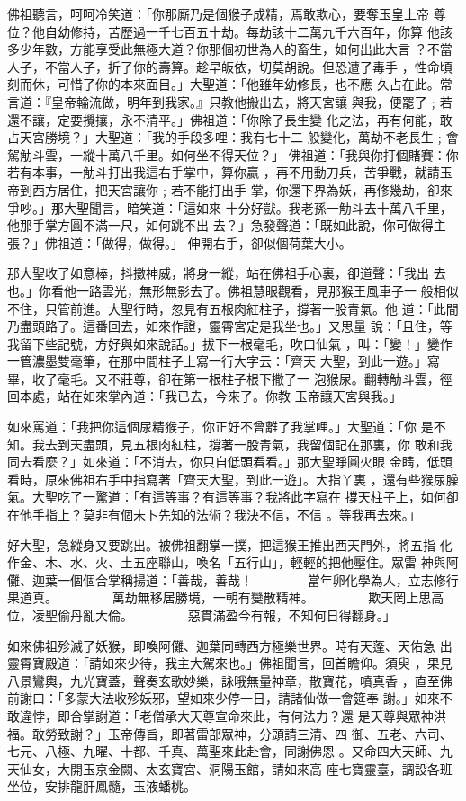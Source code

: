 \begin{pinyinscope}
{佛祖聽言，呵呵冷笑道：「你那廝乃是個猴子成精，焉敢欺心，要奪玉皇上帝
尊位？他自幼修持，苦歷過一千七百五十劫。每劫該十二萬九千六百年，你算
他該多少年數，方能享受此無極大道？你那個初世為人的畜生，如何出此大言
？不當人子，不當人子，折了你的壽算。趁早皈依，切莫胡說。但恐遭了毒手
，性命頃刻而休，可惜了你的本來面目。」大聖道：「他雖年幼修長，也不應
久占在此。常言道：『皇帝輪流做，明年到我家。』只教他搬出去，將天宮讓
與我，便罷了﹔若還不讓，定要攪攘，永不清平。」佛祖道：「你除了長生變
化之法，再有何能，敢占天宮勝境？」大聖道：「我的手段多哩：我有七十二
般變化，萬劫不老長生﹔會駕觔斗雲，一縱十萬八千里。如何坐不得天位？」
佛祖道：「我與你打個賭賽：你若有本事，一觔斗打出我這右手掌中，算你贏
，再不用動刀兵，苦爭戰，就請玉帝到西方居住，把天宮讓你﹔若不能打出手
掌，你還下界為妖，再修幾劫，卻來爭吵。」那大聖聞言，暗笑道：「這如來
十分好獃。我老孫一觔斗去十萬八千里，他那手掌方圓不滿一尺，如何跳不出
去？」急發聲道：「既如此說，你可做得主張？」佛祖道：「做得，做得。」
伸開右手，卻似個荷葉大小。

那大聖收了如意棒，抖擻神威，將身一縱，站在佛祖手心裏，卻道聲：「我出
去也。」你看他一路雲光，無形無影去了。佛祖慧眼觀看，見那猴王風車子一
般相似不住，只管前進。大聖行時，忽見有五根肉紅柱子，撐著一股青氣。他
道：「此間乃盡頭路了。這番回去，如來作證，靈霄宮定是我坐也。」又思量
說：「且住，等我留下些記號，方好與如來說話。」拔下一根毫毛，吹口仙氣
，叫：「變！」變作一管濃墨雙毫筆，在那中間柱子上寫一行大字云：「齊天
大聖，到此一遊。」寫畢，收了毫毛。又不莊尊，卻在第一根柱子根下撒了一
泡猴尿。翻轉觔斗雲，徑回本處，站在如來掌內道：「我已去，今來了。你教
玉帝讓天宮與我。」

如來罵道：「我把你這個尿精猴子，你正好不曾離了我掌哩。」大聖道：「你
是不知。我去到天盡頭，見五根肉紅柱，撐著一股青氣，我留個記在那裏，你
敢和我同去看麼？」如來道：「不消去，你只自低頭看看。」那大聖睜圓火眼
金睛，低頭看時，原來佛祖右手中指寫著「齊天大聖，到此一遊」。大指丫裏
，還有些猴尿臊氣。大聖吃了一驚道：「有這等事？有這等事？我將此字寫在
撐天柱子上，如何卻在他手指上？莫非有個未卜先知的法術？我決不信，不信
。等我再去來。」

好大聖，急縱身又要跳出。被佛祖翻掌一撲，把這猴王推出西天門外，將五指
化作金、木、水、火、土五座聯山，喚名「五行山」，輕輕的把他壓住。眾雷
神與阿儺、迦葉一個個合掌稱揚道：「善哉，善哉！
　　　　當年卵化學為人，立志修行果道真。
　　　　萬劫無移居勝境，一朝有變散精神。
　　　　欺天罔上思高位，凌聖偷丹亂大倫。
　　　　惡貫滿盈今有報，不知何日得翻身。」

如來佛祖殄滅了妖猴，即喚阿儺、迦葉同轉西方極樂世界。時有天蓬、天佑急
出靈霄寶殿道：「請如來少待，我主大駕來也。」佛祖聞言，回首瞻仰。須臾
，果見八景鸞輿，九光寶蓋，聲奏玄歌妙樂，詠哦無量神章，散寶花，噴真香
，直至佛前謝曰：「多蒙大法收殄妖邪，望如來少停一日，請諸仙做一會筵奉
謝。」如來不敢違悖，即合掌謝道：「老僧承大天尊宣命來此，有何法力？還
是天尊與眾神洪福。敢勞致謝？」玉帝傳旨，即著雷部眾神，分頭請三清、四
御、五老、六司、七元、八極、九曜、十都、千真、萬聖來此赴會，同謝佛恩
。又命四大天師、九天仙女，大開玉京金闕、太玄寶宮、洞陽玉館，請如來高
座七寶靈臺，調設各班坐位，安排龍肝鳳髓，玉液蟠桃。

}
\end{pinyinscope}
